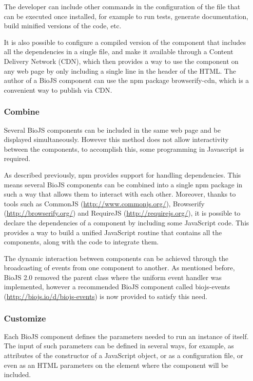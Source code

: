 The developer can include other commands in the configuration of the file that can be executed once installed, for example to run tests, generate documentation, build minified versions of the code, etc.

It is also possible to configure a compiled version of the component that includes all the dependencies in a single file, and make it available through a Content Delivery Network (CDN), which then provides a way to use the component on any web page by only including a single line in the header of the HTML. The author of a BioJS component can use the npm package browserify-cdn, which is a convenient way to publish via CDN.

\subsubsection{Combine}
Several BioJS components can be included in the same web page and be displayed simultaneously. However this method does not allow interactivity between the components, to accomplish this, some programming in Javascript is required.
 
As described previously, npm provides support for handling dependencies. This means several BioJS components can be combined into a single npm package in such a way that allows them to interact with each other. Moreover, thanks to tools such as CommonJS (\url{http://www.commonjs.org/}), Browserify (\url{http://browserify.org/}) and RequireJS (\url{http://requirejs.org/}), it is possible to declare the dependencies of a component by including some JavaScript code. This provides a way to build a unified JavaScript routine that contains all the components, along with the code to integrate them.

The dynamic interaction between components can be achieved through the broadcasting of events from one component to another. As mentioned before, BioJS 2.0 removed the parent class where the uniform event handler was implemented, however a recommended BioJS component called biojs-events (\url{http://biojs.io/d/biojs-events}) is now provided to satisfy this need.

\subsubsection{Customize}
Each BioJS component defines the parameters needed to run an instance of itself. The input of such parameters can be defined in several ways, for example, as attributes of the constructor of a JavaScript object, or as a configuration file, or even as an HTML parameters on the element where the component will be included.


